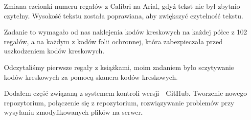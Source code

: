 
Zmiana czcionki numeru regałów z Calibri na Arial, gdyż tekst nie był zbytnio czytelny. Wysokość tekstu została poprawiana, aby zwiększyć czytelność tekstu.


Zadanie to wymagało od nas naklejenia kodów kreskowych na każdej półce z 102 regałów, a na każdym z kodów folii ochronnej, która zabezpieczała przed uszkodzeniem kodów kreskowych.


Odczytaliśmy pierwsze regały z książkami, moim zadaniem było sczytywanie kodów kreskowych za pomocą skanera kodów kreskowych.



Dodałem część związaną z systemem kontroli wersji - GitHub. Tworzenie nowego repozytorium, połączenie się z repozytorium, rozwiązywanie problemów przy wysyłaniu zmodyfikowanych plików na serwer.  
